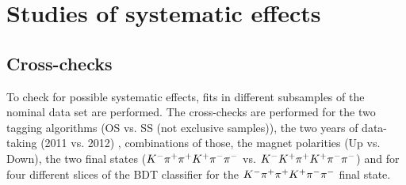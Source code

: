 
\section{Studies of systematic effects}
\label{sec:b02dd:systematics}

\subsection{Cross-checks}
\label{sec:b02dd:systematics:xchecks}
To check for possible systematic effects, fits in different subsamples of the
nominal data set are performed. The cross-checks are performed for the two
tagging algorithms (OS vs. SS (not exclusive samples)), the two years of
data-taking (2011 vs. 2012) , combinations of those, the magnet polarities (Up
vs. Down), the two final states (${{K}^-}{{\pi}^+}{{\pi}^+}{{K}^+}{{\pi}^-}{{\pi}^-}$ vs. ${{K}^-}{{K}^+}{{\pi}^+}{{K}^+}{{\pi}^-}{{\pi}^-}$) and for four
different slices of the BDT classifier for the ${{K}^-}{{\pi}^+}{{\pi}^+}{{K}^+}{{\pi}^-}{{\pi}^-}$ final state.

